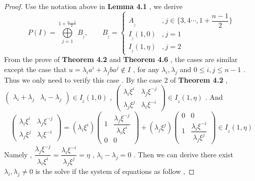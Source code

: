 \documentclass{article}
\begin{document}
\begin{proof}
    Use the notation above in \textbf{Lemma 4.1} , we derive
\[
P(I)=\bigoplus\limits_{j=1}^{1+\frac{n-1}{2}}B_{_j},\qquad 
    B_{_j}=\begin{cases}
    A_{_j}&,j\in{\{3,4\cdots,1+\dfrac{n-1}{2}\}}\\
    I_{_j}(1,0)&,j=1\\
    I_{_j}(1,\eta)&,j=2
\end{cases}
\]
From the prove of \textbf{Theorem 4.2} and \textbf{Theorem 4.6} , the cases are similar except the case that $u=\lambda_ia^{\scriptscriptstyle i}+\lambda_jba^{\scriptscriptstyle j}\notin{I}$ , for any $\lambda_i,\lambda_j$ and $0\leq i,j\leq n-1$ . Thus we only need to verify this case . By the case 2 of \textbf{Theorem 4.2} , 
$\begin{pmatrix}
    \lambda_i+\lambda_j&\lambda_i-\lambda_j
\end{pmatrix}\in{I_{_2}}(1,0)$ , 
$\begin{pmatrix}
    \lambda_i\xi^{\scriptscriptstyle i}&\lambda_j\xi^{\scriptscriptstyle-j}\\
    \lambda_j\xi^{\scriptscriptstyle j}&\lambda_i\xi^{\scriptscriptstyle-i}
\end{pmatrix}\in{I_{_2}}(1,\eta)$ . And
\begin{equation*}
    \begin{pmatrix}
      \lambda_i\xi^{\scriptscriptstyle i}&\lambda_j\xi^{\scriptscriptstyle-j}\\
      \lambda_j\xi^{\scriptscriptstyle j}&\lambda_i\xi^{\scriptscriptstyle-i}
    \end{pmatrix}=(\lambda_i\xi^{\scriptscriptstyle i})
        \begin{pmatrix}
            1&\dfrac{\lambda_j\xi^{\scriptscriptstyle-j}}{\lambda_i\xi^{\scriptscriptstyle i}}\\
            0&0
        \end{pmatrix}+(\lambda_j\xi^{\scriptscriptstyle j})
        \begin{pmatrix}
            0&0\\
            1&\dfrac{\lambda_i\xi^{\scriptscriptstyle-i}}{\lambda_j\xi^{\scriptscriptstyle j}}
        \end{pmatrix}\in{I_{_2}}(1,\eta)
\end{equation*}
Namely , $\dfrac{\lambda_j\xi^{\scriptscriptstyle-j}}{\lambda_i\xi^{\scriptscriptstyle i}}=\dfrac{\lambda_i\xi^{\scriptscriptstyle-i}}{\lambda_j\xi^{\scriptscriptstyle j}}=\eta$ , $\lambda_i-\lambda_j=0$ . Then we can derive there exist $\lambda_i,\lambda_j\neq0$ is the solve if the system of equations as follow , 

\end{proof}
\end{document}
